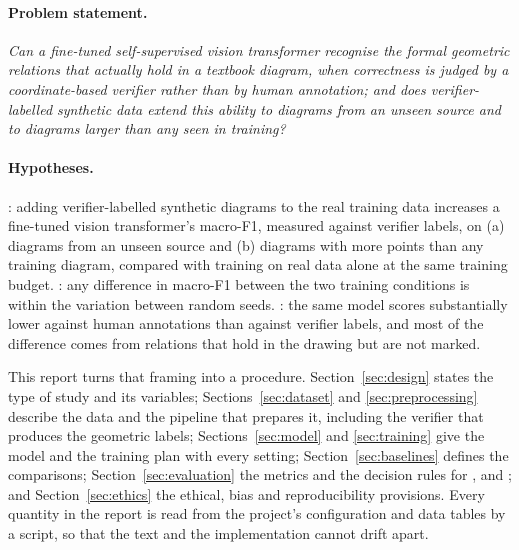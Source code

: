 \paragraph{Problem statement.} \emph{Can a fine-tuned self-supervised vision transformer recognise the formal geometric relations that actually hold in a textbook diagram, when correctness is judged by a coordinate-based verifier rather than by human annotation; and does verifier-labelled synthetic data extend this ability to diagrams from an unseen source and to diagrams larger than any seen in training?}

\paragraph{Hypotheses.} \Hone: adding verifier-labelled synthetic diagrams to the real training data increases a fine-tuned vision transformer's macro-F1, measured against verifier labels, on (a) diagrams from an unseen source and (b) diagrams with more points than any training diagram, compared with training on real data alone at the same training budget. \Hzero: any difference in macro-F1 between the two training conditions is within the variation between random seeds. \Htwo: the same model scores substantially lower against human annotations than against verifier labels, and most of the difference comes from relations that hold in the drawing but are not marked.

This report turns that framing into a procedure. Section~\ref{sec:design} states the type of study and its variables; Sections~\ref{sec:dataset} and \ref{sec:preprocessing} describe the data and the pipeline that prepares it, including the verifier that produces the geometric labels; Sections~\ref{sec:model} and \ref{sec:training} give the model and the training plan with every setting; Section~\ref{sec:baselines} defines the comparisons; Section~\ref{sec:evaluation} the metrics and the decision rules for \Hone, \Hzero{} and \Htwo; and Section~\ref{sec:ethics} the ethical, bias and reproducibility provisions. Every quantity in the report is read from the project's configuration and data tables by a script, so that the text and the implementation cannot drift apart.
